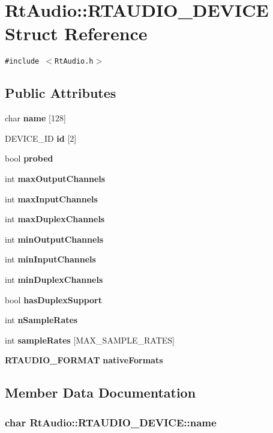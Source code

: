 \section{Rt\-Audio::RTAUDIO\_\-DEVICE  Struct Reference}
\label{structRtAudio_1_1RTAUDIO__DEVICE}
{\tt \#include $<$Rt\-Audio.h$>$}

\subsection*{Public Attributes}
\begin{CompactItemize}
\item 
char {\bf name} [128]
\item 
DEVICE\_\-ID {\bf id} [2]
\item 
bool {\bf probed}
\item 
int {\bf max\-Output\-Channels}
\item 
int {\bf max\-Input\-Channels}
\item 
int {\bf max\-Duplex\-Channels}
\item 
int {\bf min\-Output\-Channels}
\item 
int {\bf min\-Input\-Channels}
\item 
int {\bf min\-Duplex\-Channels}
\item 
bool {\bf has\-Duplex\-Support}
\item 
int {\bf n\-Sample\-Rates}
\item 
int {\bf sample\-Rates} [MAX\_\-SAMPLE\_\-RATES]
\item 
{\bf RTAUDIO\_\-FORMAT} {\bf native\-Formats}
\end{CompactItemize}


\subsection{Member Data Documentation}
\subsubsection{\setlength{\rightskip}{0pt plus 5cm}char Rt\-Audio::RTAUDIO\_\-DEVICE::name}\label{structRtAudio_1_1RTAUDIO__DEVICE_m0}


